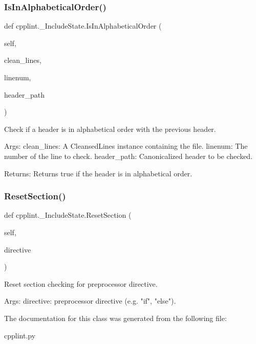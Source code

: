 \subsubsection{\texorpdfstring{Is\+In\+Alphabetical\+Order()}{IsInAlphabeticalOrder()}}
{\footnotesize\ttfamily def cpplint.\+\_\+\+Include\+State.\+Is\+In\+Alphabetical\+Order (\begin{DoxyParamCaption}\item[{}]{self,  }\item[{}]{clean\+\_\+lines,  }\item[{}]{linenum,  }\item[{}]{header\+\_\+path }\end{DoxyParamCaption})}

\begin{DoxyVerb}Check if a header is in alphabetical order with the previous header.

Args:
  clean_lines: A CleansedLines instance containing the file.
  linenum: The number of the line to check.
  header_path: Canonicalized header to be checked.

Returns:
  Returns true if the header is in alphabetical order.
\end{DoxyVerb}
 \mbox{\label{classcpplint_1_1__IncludeState_a31551f83fcc626e7babb1581a486b6fa}} 
\subsubsection{\texorpdfstring{Reset\+Section()}{ResetSection()}}
{\footnotesize\ttfamily def cpplint.\+\_\+\+Include\+State.\+Reset\+Section (\begin{DoxyParamCaption}\item[{}]{self,  }\item[{}]{directive }\end{DoxyParamCaption})}

\begin{DoxyVerb}Reset section checking for preprocessor directive.

Args:
  directive: preprocessor directive (e.g. "if", "else").
\end{DoxyVerb}
 

The documentation for this class was generated from the following file\+:\begin{DoxyCompactItemize}
\item 
cpplint.\+py\end{DoxyCompactItemize}
